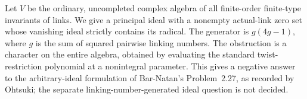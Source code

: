 
Let \(V\) be the ordinary, uncompleted complex algebra of all finite-order
finite-type invariants of links. We give a principal ideal with a nonempty
actual-link zero set whose vanishing ideal strictly contains its radical.
The generator is \(g(4g-1)\), where \(g\) is the sum of squared pairwise
linking numbers. The obstruction is a character on the entire algebra,
obtained by evaluating the standard twist-restriction polynomial at a
nonintegral parameter. This gives a negative answer to the arbitrary-ideal
formulation of Bar-Natan's Problem~2.27, as recorded by Ohtsuki; the separate
linking-number-generated ideal question is not decided.
